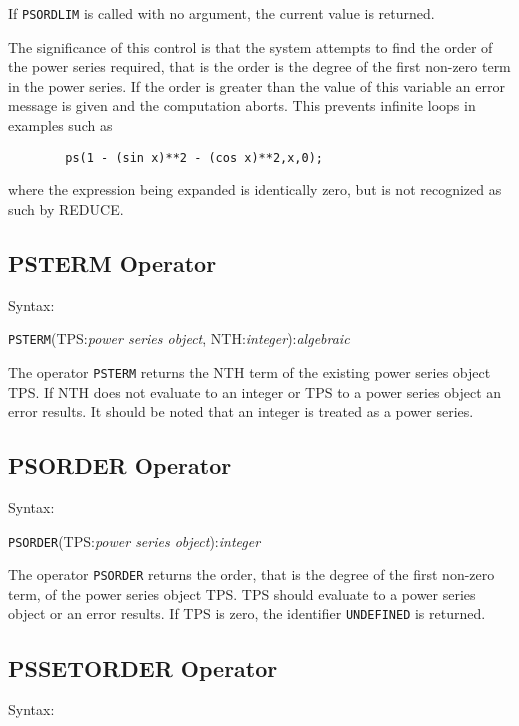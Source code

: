 If {\tt PSORDLIM} is called with no argument, the current value is
returned.

The significance of this control is that the system attempts to find
the order of the power series required, that is the order is the
degree of the first non-zero term in the power series.  If the order
is greater than the value of this variable an error message is given
and the computation aborts. This prevents infinite loops in examples
such as

\begin{verbatim}
        ps(1 - (sin x)**2 - (cos x)**2,x,0);
\end{verbatim}

where the expression being expanded is identically zero, but is not
recognized as such by REDUCE.


\subsection{PSTERM Operator}

Syntax:

\hspace*{2em} {\tt PSTERM}(TPS:{\em power series object},
NTH:{\em integer}):{\em algebraic}

The operator {\tt PSTERM} returns the NTH term of the existing
power series object TPS. If NTH does not evaluate to
an integer or TPS to a power series object an error results.  It
should be noted that an integer is treated as a power series.


\subsection{PSORDER Operator}

Syntax:

\hspace*{2em} {\tt PSORDER}(TPS:{\em power series object}):{\em integer}

The operator {\tt PSORDER} returns the order, that is the degree of
the first non-zero term, of the power series object TPS.
TPS should evaluate to a power series object or an error results. If
TPS is zero, the identifier {\tt UNDEFINED} is returned.

\subsection{PSSETORDER Operator}

Syntax:

